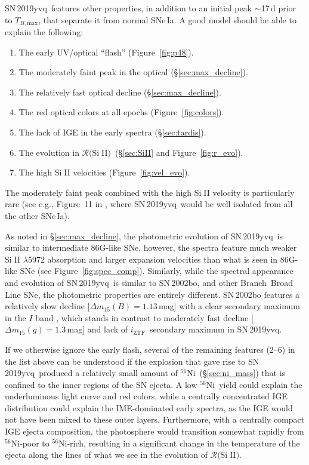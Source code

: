 \documentclass[twocolumn]{aastex63}
\def\ion#1#2{#1$\;${\footnotesize\rm{#2}}\relax}
\newcommand{\todo}[1]{{\color{magenta} to-do: {#1}}}
\newcommand{\iztf}{$i_\mathrm{ZTF}$}
\newcommand{\tbmax}{$T_{B,\mathrm{max}}$}
\newcommand{\RSiII}{$\mathcal{R}($\ion{Si}{II}$)$}
\newcommand{\radni}{$^{56}$Ni}
\newcommand{\sn}{SN\,2019yvq}
\begin{document}
\sn\ features other properties, in addition to an initial peak $\sim$17\,d
prior to \tbmax, that separate it from normal SNe\,Ia. A good model should be
able to explain the following:
%
\begin{enumerate}
    \item The early UV/optical ``flash'' (Figure~\ref{fig:p48}).
    \item The moderately faint peak in the optical (\S\ref{sec:max_decline}). 
    \item The relatively fast optical decline (\S\ref{sec:max_decline}). 
    \item The red optical colors at all epochs (Figure~\ref{fig:colors}). 
    \item The lack of IGE in the early spectra (\S\ref{sec:tardis}).
    \item The evolution in \RSiII\ (\S\ref{sec:SiII} and Figure~\ref{fig:r_evo}).
    \item The high \ion{Si}{II} velocities (Figure~\ref{fig:vel_evo}).
\end{enumerate}
%
The moderately faint peak combined with the high \ion{Si}{II} velocity is
particularly rare (see e.g., Figure~11 in \citealt{Polin19}, where \sn\ would
be well isolated from all the other SNe\,Ia).

As noted in \S\ref{sec:max_decline}, the photometric evolution of \sn\ is
similar to intermediate 86G-like SNe, however, the spectra feature much weaker
\ion{Si}{II} $\lambda$5972 absorption and larger expansion velocities than
what is seen in 86G-like SNe (see Figure~\ref{fig:spec_comp}). Similarly,
while the spectral appearance and evolution of \sn\ is similar to SN\,2002bo,
and other Branch~Broad Line SNe, the photometric properties are
entirely different. SN\,2002bo features a relatively slow decline
[$\Delta{m}_{15}(B) = 1.13$\,mag] with a clear secondary maximum in the $I$
band \citep{Benetti04}, which stands in contrast to moderately fast decline
[$\Delta{m}_{15}(g) = 1.3$\,mag] and lack of \iztf\ secondary maximum in \sn.

If we otherwise ignore the early flash, several of the remaining features
(2--6) in the list above can be understood if the explosion that gave rise to
\sn\ produced a relatively small amount of \radni\ (\S\ref{sec:ni_mass}) that
is confined to the inner regions of the SN ejecta. A low \radni\ yield could
explain the underluminous light curve and red colors, while a centrally
concentrated IGE distribution could explain the IME-dominated early spectra,
as the IGE would not have been mixed to these outer layers. Furthermore, with
a centrally compact IGE ejecta composition, the photosphere would transition
somewhat rapidly from \radni-poor to \radni-rich, resulting in a significant
change in the temperature of the ejecta along the lines of what we see in the
evolution of \RSiII.
\end{document}
